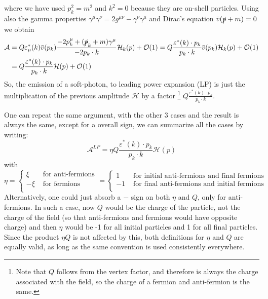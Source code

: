 \documentclass{article}
\newcommand{\s}[1]{\slashed #1}
\begin{document}
where we have used $p_k^2=m^2$ and $k^2=0$ because they are on-shell particles.
Using also the gamma properties
$\gamma^\mu \gamma^\nu = 2 g^{\mu\nu}-\gamma^\nu \gamma^\mu$
and Dirac's equation $\bar{v}(\s{p}+m) = 0$ we obtain
\begin{align*}
	\mathcal{A} &
	= Q \varepsilon^*_\mu(k) \bar{v}(p_k)
	\frac{-2p_k^\mu + (\s{p}_k + m)\gamma^\mu}{-2p_k\cdot k} \mathcal{H}_k(p)
	+ \order{1}
	= Q \frac{\varepsilon^*(k) \cdot p_k}{p_k \cdot k} \bar{v}(p_k) \mathcal{H}_k(p)
	+ \order{1}\\&
	= Q \frac{\varepsilon^*(k) \cdot p_k}{p_k \cdot k} \mathcal{H}(p)
	+ \order{1}
\end{align*}
So, the emission of a soft-photon, to leading power expansion (LP)
is just the multiplication of the previous amplitude $\mathcal{H}$ by a factor
\footnote{
	Note that $Q$ follows from the vertex factor,
	and therefore is always the charge associated with the field,
	so the charge of a fermion and anti-fermion is the same.
}
$Q \frac{\varepsilon^*(k) \cdot p_k}{p_k \cdot k}$.

One can repeat the same argument,
with the other 3 cases and the result is always the same,
except for a overall sign, we can summarize all the cases by writing:
\begin{equation*}
	\mathcal{A}^{LP}
	= \eta Q \frac{\varepsilon^*(k) \cdot p_k}{p_k \cdot k} \mathcal{H}(p)
\end{equation*}
with
\begin{equation}\label{eq:definition eta}
	\eta
	= \begin{cases}
        \xi & \text{ for anti-fermions}\\
        -\xi & \text{ for fermions}\\
    \end{cases}
    = \begin{cases}
		1 & \text{ for initial anti-fermions and final fermions}\\
		-1 & \text{ for final anti-fermions and initial fermions}\\
	\end{cases}
\end{equation}
Alternatively, one could just absorb a $-$ sign on both $\eta$ and $Q$,
only for anti-fermions.
In such a case, now $Q$ would be the charge of the particle,
not the charge of the field
(so that anti-fermions and fermions would have opposite charge)
and then $\eta$ would be -1 for all initial particles and 1 for all final particles.
Since the product $\eta Q$ is not affected by this,
both definitions for $\eta$ and $Q$ are equally valid,
as long as the same convention is used consistently everywhere.
\end{document}
